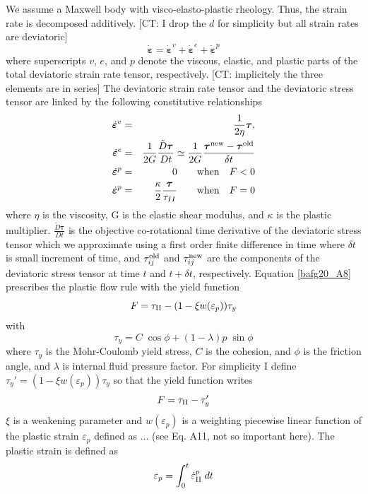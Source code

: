 We assume a Maxwell body with visco-elasto-plastic rheology. Thus, the strain rate is decomposed additively.
[CT: I drop the $d$ for simplicity but all strain rates are deviatoric]
\begin{equation}
\dot {\bm \varepsilon}=
\dot {\bm \varepsilon}^{v}+
\dot {\bm \varepsilon}^{e}+
\dot {\bm \varepsilon}^{p}\label{bafg20_A5} 
\end{equation}
where superscripts $v$, $e$, and $p$ denote the viscous, elastic, and plastic parts of the 
total deviatoric strain rate tensor, respectively. 
[CT: implicitely the three elements are in series]
The deviatoric strain rate tensor 
and the deviatoric stress tensor are linked by the following constitutive relationships
\begin{eqnarray}
\dot {\bm \varepsilon}^{v} &=& \frac{1}{2\eta } {\bm \tau},  \label{bafg20_A6}    \\
\dot {\bm \varepsilon}^{e} &=& \frac{1}{2 G } \frac{\tilde{D} {\bm \tau}}{Dt} 
\simeq \frac{1}{2G}  \frac{ {\bm \tau}^{\rm new} - {\bm \tau}^{\rm old}  }{\delta t} \label{bafg20_A7}    \\
\dot {\bm \varepsilon}^{p} &=& 0 \qquad \text{when} \quad F<0 \nonumber\\
\dot {\bm \varepsilon}^{p} &=& \frac{\kappa}{2} \frac{{\bm \tau}}{\tau_{II}} 
\qquad \text{when} \quad F=0  \label{bafg20_A8}    
\end{eqnarray}
where $\eta$ is the viscosity, G is the elastic shear modulus, and $\kappa$ is the plastic multiplier.
$\frac{\tilde{D} {\bm \tau}}{Dt}$ is the objective
co-rotational time derivative of the deviatoric stress tensor which we approximate using a first order finite
difference in time where $\delta t$ is small increment of time, 
and $\tau_{ij}^{\rm old}$ and $\tau_{ij}^{\rm new}$ are the components of the deviatoric stress 
tensor at time $t$ and $t+\delta t$, respectively. Equation \eqref{bafg20_A8} prescribes the plastic flow rule with the
yield function
\begin{equation}
F=\tau_{\rm II} - (1- \xi w(\varepsilon_p)) \tau_y \label{bafg20_A9}    
\end{equation}
with
\begin{equation}
\tau_y = C \; \cos \phi + (1-\lambda) p \; \sin \phi \label{bafg20_A10}    
\end{equation}
where $\tau_y$ is the Mohr-Coulomb yield stress, $C$ is the cohesion, 
and $\phi$ is the friction angle, and $\lambda$ is internal fluid pressure factor. 
For simplicity I define $\tau_y'=(1- \xi w(\varepsilon_p)) \tau_y$ so that 
the yield function writes
\begin{equation}
F=\tau_{\rm II} - \tau_y'
\end{equation}
$\xi$ is a weakening parameter and $w(\varepsilon_p)$ is a weighting 
piecewise linear function of the plastic strain $\varepsilon_p$ defined as ...
(see Eq. A11, not so important here).
The plastic strain is defined as
\begin{equation}
\varepsilon_p = \int_0^t \dot\varepsilon_{\rm II}^p \; dt
\end{equation}

